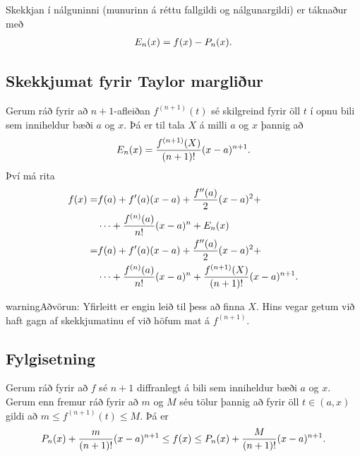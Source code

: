 \documentclass[a4paper,10pt,icelandic]{sphinxmanual}
\begin{document}
Skekkjan í nálguninni (munurinn á réttu fallgildi og nálgunargildi) er
táknaður með
\begin{gather}
\begin{split}E_n(x)=f(x)-P_n(x).\end{split}\notag
\end{gather}

\subsection{Skekkjumat fyrir Taylor margliður}
\label{kafli03:skekkjumat-fyrir-taylor-margliur}
Gerum ráð fyrir að \(n+1\)-afleiðan \(f^{(n+1)}(t)\) sé
skilgreind fyrir öll \(t\) í opnu bili sem inniheldur bæði \(a\)
og \(x\). Þá er til tala \(X\) á milli \(a\) og \(x\)
þannig að
\begin{gather}
\begin{split}E_n(x)=\frac{f^{(n+1)}(X)}{(n+1)!}(x-a)^{n+1}.\end{split}\notag
\end{gather}
Því má rita
\begin{gather}
\begin{split}\begin{aligned}
f(x)
=&f(a)+f'(a)(x-a)+\frac{f''(a)}{2}(x-a)^2+ \\
 & \cdots+\frac{f^{(n)}(a)}{n!}(x-a)^n+E_n(x)\\
=&f(a)+f'(a)(x-a)+\frac{f''(a)}{2}(x-a)^2+\\
 & \cdots+\frac{f^{(n)}(a)}{n!}(x-a)^n
  +\frac{f^{(n+1)}(X)}{(n+1)!}(x-a)^{n+1}.\end{aligned}\end{split}\notag
\end{gather}
\begin{notice}{warning}{Aðvörun:}
Yfirleitt er engin leið til þess að finna \(X\).
Hins vegar getum við haft gagn af skekkjumatinu ef
við höfum mat á \(f^{(n+1)}\).
\end{notice}


\subsection{Fylgisetning}
\label{kafli03:fylgisetning}
Gerum ráð fyrir að \(f\) sé \(n+1\) diffranlegt á bili sem
inniheldur bæði \(a\) og \(x\). Gerum enn fremur ráð fyrir að
\(m\) og \(M\) séu tölur þannig að fyrir öll \(t\in (a, x)\)
gildi að \(m\leq f^{(n+1)}(t)\leq M\). Þá er
\begin{gather}
\begin{split}P_n(x) + \frac{m}{(n+1)!}(x-a)^{n+1} \leq f(x)
\leq P_n(x) + \frac{M}{(n+1)!}(x-a)^{n+1}.\end{split}\notag
\end{gather}
\end{document}
